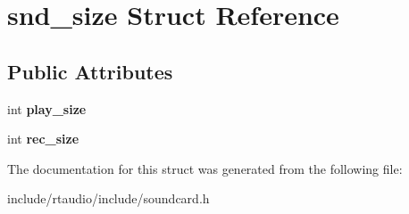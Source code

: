 \hypertarget{structsnd__size}{}\section{snd\+\_\+size Struct Reference}
\label{structsnd__size}
\subsection*{Public Attributes}
\begin{DoxyCompactItemize}
\item 
int {\bfseries play\+\_\+size}\hypertarget{structsnd__size_a871a7d74b1f344ba039eab165a3033f3}{}\label{structsnd__size_a871a7d74b1f344ba039eab165a3033f3}

\item 
int {\bfseries rec\+\_\+size}\hypertarget{structsnd__size_a33bb0a04b3f736899ed3c0824992dbd3}{}\label{structsnd__size_a33bb0a04b3f736899ed3c0824992dbd3}

\end{DoxyCompactItemize}


The documentation for this struct was generated from the following file\+:\begin{DoxyCompactItemize}
\item 
include/rtaudio/include/soundcard.\+h\end{DoxyCompactItemize}
